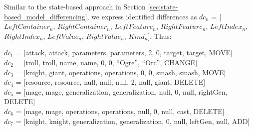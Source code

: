 
Similar to the state-based approach in Section \ref{sec:state-based_model_differencing}, we express identified differences as $dc_{n}$ = [$LeftContainer_n$, $RightContainer_n$, $LeftFeature_n$, $RightFeature_n$, $LeftIndex_n$, $RightIndex_n$, $LeftValue_n$, $RightValue_n$, $Kind_n$]. Thus:

$dc_{1}$ =  [\textsf{attack}, \textsf{attack}, \textsf{parameters}, \textsf{parameters}, 2, 0, \textsf{target}, \textsf{target}, \textsf{MOVE}]\\
$dc_{2}$ = [\textsf{troll}, \textsf{troll}, \textsf{name}, \textsf{name}, 0, 0, ``Ogre'', ``Orc'', \textsf{CHANGE}]\\
$dc_{3}$ = [\textsf{knight}, \textsf{giant}, \textsf{operations}, \textsf{operations}, 0, 0, \textsf{smash}, \textsf{smash}, \textsf{MOVE}]\\
$dc_{4}$ = [\textsf{resource}, \textsf{resource}, \textsf{null}, \textsf{null}, \textsf{null}, 2, \textsf{null}, \textsf{giant}, \textsf{DELETE}]\\
$dc_{5}$ = [\textsf{mage}, \textsf{mage}, \textsf{generalization}, \textsf{generalization}, \textsf{null}, 0, \textsf{null}, \textsf{rightGen}, \textsf{DELETE}] \\
$dc_{6}$ = [\textsf{mage}, \textsf{mage}, \textsf{operations}, \textsf{operations}, \textsf{null}, 0, \textsf{null}, \textsf{cast}, \textsf{DELETE}]\\
$dc_{7}$ = [\textsf{knight}, \textsf{knight}, \textsf{generalization}, \textsf{generalization}, 0, \textsf{null}, \textsf{leftGen}, \textsf{null}, \textsf{ADD}]

